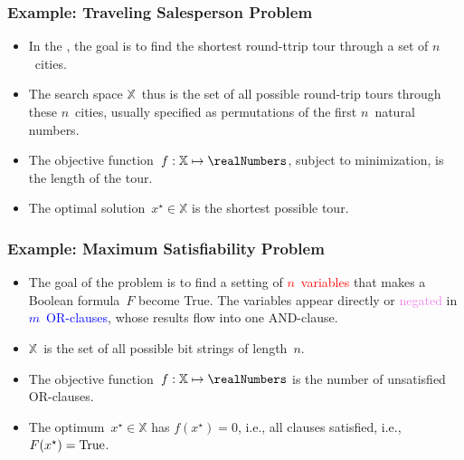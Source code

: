 \documentclass[aspectratio=169,mathserif,notheorems]{beamer}%
\gdef\searchSpace{\ensuremath{\mathbb{X}}}%
\gdef\sespel{\ensuremath{x}}%
\gdef\opti#1{\ensuremath{#1^{\star}}}%
\begin{document}
%
\begin{frame}%
\frametitle{Example: Traveling Salesperson Problem}%
\parbox{0.373\paperwidth}{%
\begin{itemize}%
%
\item In the \cite{ABCC2006TTSPACS,LLRKS1985TTSPAGTOCO,GP2002TTSPAIV,WCLTTCMY2014BOAAOSFFTTSP}, the goal is to find the shortest round-ttrip tour through a set of $n$~cities.%
%
\item<2-> The search space \searchSpace\ thus is the set of all possible round-trip tours through these $n$~cities, usually specified as permutations of the first $n$~natural numbers.%
%
\item<3-> The objective function~$f:\searchSpace\mapsto\realNumbers$, subject to minimization, is the length of the tour.%
%
\item<4-> The optimal solution~$\opti{\sespel}\in\searchSpace$ is the shortest possible tour.%
%
\end{itemize}%
}%
%
%
%
%
\end{frame}%
%
\begin{frame}%
\frametitle{Example: Maximum Satisfiability Problem}%
\parbox{0.42\paperwidth}{%
\begin{itemize}%
%
\item The goal of the \cite{HS2004SLSFAA,C1971TCOTPP} problem is to find a setting of \textcolor<2>{red}{$n$~variables} that makes a Boolean formula~$F$ become True. %
The variables appear directly or \textcolor<3>{violet}{negated} in \textcolor<4>{blue}{$m$~OR\nobreakdashes-clauses}, whose results flow into \textcolor<5>{green!40!black}{one AND\nobreakdashes-clause}.%
%
\item<6-> \searchSpace\ is the set of all possible bit strings of length~$n$.%
%
\item<7-> The objective function~$f:\searchSpace\mapsto\realNumbers$ is the number of unsatisfied OR\nobreakdashes-clauses.%
%
\item<8-> The optimum~$\opti{\sespel}\in\searchSpace$ has $f(\opti{\sespel})=0$, i.e., all clauses satisfied, i.e., $F(\opti{\sespel})=\textnormal{True}$.%
%
\end{itemize}%
}%
%
%
%
%
%
%
%
\end{frame}%
\end{document}
